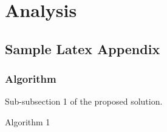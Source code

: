 \documentclass{mscreport}
\begin{document}
\newpage

\section{Analysis}

\newpage






\newpage

\begin{appendices}
\section{Sample Latex Appendix}

\subsubsection{Algorithm}

Sub-subsection 1 of the proposed solution.

\begin{algorithm}
\caption{Algorithm 1}\label{euclid}
\begin{algorithmic}
\Else {}
\EndIf   
\end{algorithmic}
\end{algorithm}

\end{appendices}
\end{document}
